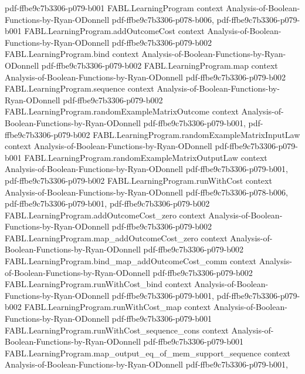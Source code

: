 \begin{theorem}
  {pdf-ffbe9c7b3306-p079-b001}
\proofstep
  {FABL.LearningProgram}
  {context}
  {Analysis-of-Boolean-Functions-by-Ryan-ODonnell}
  {pdf-ffbe9c7b3306-p078-b006,
    pdf-ffbe9c7b3306-p079-b001}
\proofstep
  {FABL.LearningProgram.addOutcomeCost}
  {context}
  {Analysis-of-Boolean-Functions-by-Ryan-ODonnell}
  {pdf-ffbe9c7b3306-p079-b002}
\proofstep
  {FABL.LearningProgram.bind}
  {context}
  {Analysis-of-Boolean-Functions-by-Ryan-ODonnell}
  {pdf-ffbe9c7b3306-p079-b002}
\proofstep
  {FABL.LearningProgram.map}
  {context}
  {Analysis-of-Boolean-Functions-by-Ryan-ODonnell}
  {pdf-ffbe9c7b3306-p079-b002}
\proofstep
  {FABL.LearningProgram.sequence}
  {context}
  {Analysis-of-Boolean-Functions-by-Ryan-ODonnell}
  {pdf-ffbe9c7b3306-p079-b002}
\proofstep
  {FABL.LearningProgram.randomExampleMatrixOutcome}
  {context}
  {Analysis-of-Boolean-Functions-by-Ryan-ODonnell}
  {pdf-ffbe9c7b3306-p079-b001,
    pdf-ffbe9c7b3306-p079-b002}
\proofstep
  {FABL.LearningProgram.randomExampleMatrixInputLaw}
  {context}
  {Analysis-of-Boolean-Functions-by-Ryan-ODonnell}
  {pdf-ffbe9c7b3306-p079-b001}
\proofstep
  {FABL.LearningProgram.randomExampleMatrixOutputLaw}
  {context}
  {Analysis-of-Boolean-Functions-by-Ryan-ODonnell}
  {pdf-ffbe9c7b3306-p079-b001,
    pdf-ffbe9c7b3306-p079-b002}
\proofstep
  {FABL.LearningProgram.runWithCost}
  {context}
  {Analysis-of-Boolean-Functions-by-Ryan-ODonnell}
  {pdf-ffbe9c7b3306-p078-b006,
    pdf-ffbe9c7b3306-p079-b001,
    pdf-ffbe9c7b3306-p079-b002}
\proofstep
  {FABL.LearningProgram.addOutcomeCost_zero}
  {context}
  {Analysis-of-Boolean-Functions-by-Ryan-ODonnell}
  {pdf-ffbe9c7b3306-p079-b002}
\proofstep
  {FABL.LearningProgram.map_addOutcomeCost_zero}
  {context}
  {Analysis-of-Boolean-Functions-by-Ryan-ODonnell}
  {pdf-ffbe9c7b3306-p079-b002}
\proofstep
  {FABL.LearningProgram.bind_map_addOutcomeCost_comm}
  {context}
  {Analysis-of-Boolean-Functions-by-Ryan-ODonnell}
  {pdf-ffbe9c7b3306-p079-b002}
\proofstep
  {FABL.LearningProgram.runWithCost_bind}
  {context}
  {Analysis-of-Boolean-Functions-by-Ryan-ODonnell}
  {pdf-ffbe9c7b3306-p079-b001,
    pdf-ffbe9c7b3306-p079-b002}
\proofstep
  {FABL.LearningProgram.runWithCost_map}
  {context}
  {Analysis-of-Boolean-Functions-by-Ryan-ODonnell}
  {pdf-ffbe9c7b3306-p079-b001}
\proofstep
  {FABL.LearningProgram.runWithCost_sequence_cons}
  {context}
  {Analysis-of-Boolean-Functions-by-Ryan-ODonnell}
  {pdf-ffbe9c7b3306-p079-b001}
\proofstep
  {FABL.LearningProgram.map_output_eq_of_mem_support_sequence}
  {context}
  {Analysis-of-Boolean-Functions-by-Ryan-ODonnell}
  {pdf-ffbe9c7b3306-p079-b001,
}
\end{theorem}
